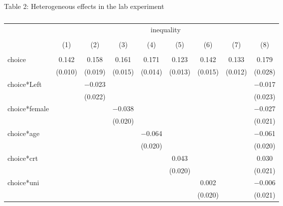\documentclass{beamer}
\begin{document}
\begin{frame}{Table 2: Heterogeneous effects in the lab experiment}
	
	\begin{block}\tiny
		\begin{table}[!htbp] \centering \tiny
  \caption{} 
\label{tbl:o2} 
\begin{tabular}{@{\extracolsep{0pt}}lcccccccc} 
	\\[-1.0ex] & \multicolumn{8}{c}{inequality} \\ 
	\\[-1.0ex] & (1) & (2) & (3) & (4) & (5) & (6) & (7) & (8)\\ 
	\hline \\[-1.0ex] 
	choice & 0.142 & 0.158 & 0.161 & 0.171 & 0.123 & 0.142 & 0.133 & 0.179 \\ 
	& (0.010) & (0.019) & (0.015) & (0.014) & (0.013) & (0.015) & (0.012) & (0.028) \\ 
	choice*Left &  & $-$0.023 &  &  &  &  &  & $-$0.017 \\ 
	&  & (0.022) &  &  &  &  &  & (0.023) \\ 
	choice*female &  &  & $-$0.038 &  &  &  &  & $-$0.027 \\ 
	&  &  & (0.020) &  &  &  &  & (0.021) \\ 
	choice*age &  &  &  & $-$0.064 &  &  &  & $-$0.061 \\ 
	&  &  &  & (0.020) &  &  &  & (0.020) \\ 
	choice*crt &  &  &  &  & 0.043 &  &  & 0.030 \\ 
	&  &  &  &  & (0.020) &  &  & (0.021) \\ 
	choice*uni &  &  &  &  &  & 0.002 &  & $-$0.006 \\ 
	&  &  &  &  &  & (0.020) &  & (0.021) \\ 

\end{tabular}
\end{table}
\end{block}
\end{frame}
\end{document}

